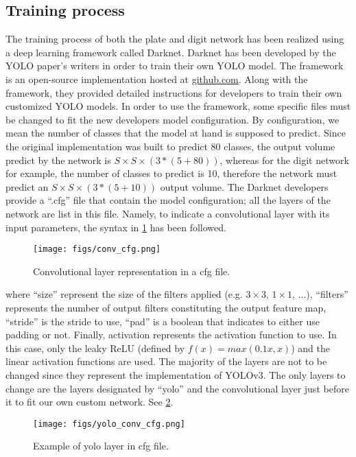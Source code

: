 \subsection{Training process}
The training process of both the plate and digit network has been realized using a deep learning framework called Darknet.
Darknet has been developed by the YOLO paper's writers in order to train their own YOLO model. The framework is an
open-source implementation hosted at \url{github.com}. Along with the framework, they provided detailed instructions
for developers to train their own customized YOLO models. In order to use the framework, some specific files must be changed
to fit the new developers model configuration. By configuration, we mean the number of classes that the model at hand
is supposed to predict. Since the original implementation was built to predict 80 classes, the output volume
predict by the network is $S \times S \times (3 * (5 + 80))$, whereas for the digit network for example, the number of
classes to predict is 10, therefore the network must predict an $S \times S \times (3 * (5 + 10))$ output volume. The Darknet developers provide a ``.cfg'' file that contain the model configuration; all the layers of the network are list in this file. Namely, to indicate a convolutional layer with its input parameters, the syntax in \cref{fig:conv_cfg} has been followed.

\begin{figure}[!htpb]
	\centering
	\texttt{[image: figs/conv\_cfg.png]}
	\caption{Convolutional layer representation in a cfg file.}
	\label{fig:conv_cfg}
\end{figure}

where ``size'' represent the size of the filters applied (e.g. $3 \times 3$, $1 \times 1$, ...), ``filters'' represents the number of output filters constituting the output feature map, ``stride'' is the stride to use, ``pad'' is a boolean that indicates to either use padding or not. Finally, activation represents the activation function to use. In this case, only the leaky ReLU (defined by $f(x) = max(0.1x, x)$) and the linear activation functions are used.
The majority of the layers are not to be changed since they represent the implementation of YOLOv3. The only layers
to change are the layers designated by ``yolo'' and the convolutional layer just before it to fit our own custom network. See \cref{fig:yolo_conv_cfg}.

\begin{figure}[!htpb]
	\centering
	\texttt{[image: figs/yolo\_conv\_cfg.png]}
	\caption{Example of yolo layer in cfg file.}
	\label{fig:yolo_conv_cfg}
\end{figure}

